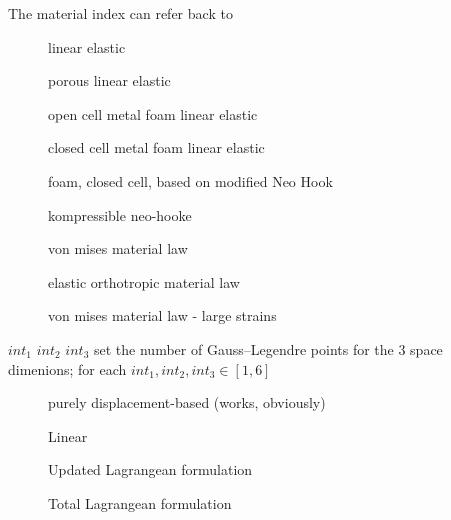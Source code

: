  The material  index can refer back to
\begin{description}
\item[] linear elastic
\item[] porous linear elastic
\item[] open cell metal foam linear elastic
\item[] closed cell metal foam linear elastic
\item[] foam, closed cell, based on modified Neo Hook
\item[] kompressible neo-hooke
\item[] von mises material law
\item[] elastic orthotropic material law
\item[]  von mises material law - large
  strains
\item[] 
\end{description}

 $int_1$ $int_2$ $int_3$ set the number of Gauss--Legendre points for
the $3$ space dimenions; for each $int_1, int_2, int_3 \in [1,6]$

\begin{description}
\item[] purely displacement-based (works, obviously)
\item[] 
\end{description}

\begin{description}
\item[] Linear
\item[] Updated Lagrangean formulation 
\item[] Total Lagrangean formulation
\end{description}

